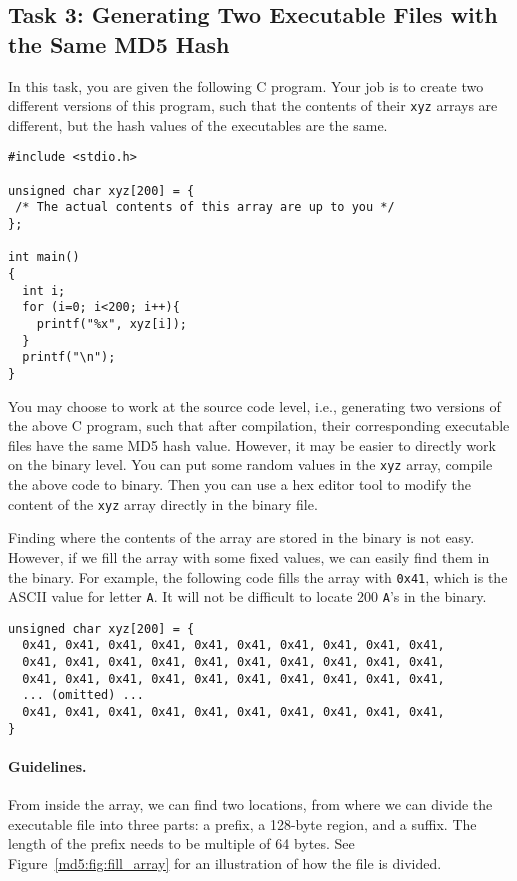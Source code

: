\subsection{Task 3: Generating Two Executable Files with the Same MD5 Hash}

In this task, you are given the following C program.
Your job is to create two different versions of this program, such that
the contents of their \texttt{xyz} arrays are different, but the
hash values of the executables are the same. 


\begin{lstlisting}
#include <stdio.h>

unsigned char xyz[200] = {
 /* The actual contents of this array are up to you */
};

int main()
{
  int i;
  for (i=0; i<200; i++){
    printf("%x", xyz[i]);
  }
  printf("\n");
}
\end{lstlisting}
 

You may choose to work at the source code level, i.e., generating two
versions of the above C program, such that after compilation, their 
corresponding executable files have the same MD5 hash value. However,
it may be easier to directly work on the binary level. You can 
put some random values in the \texttt{xyz} array,  
compile the above code to binary. Then you can use a hex editor 
tool to modify the content of the \texttt{xyz} array directly
in the binary file. 

Finding where the contents of the array are stored in the binary is 
not easy. However, if we fill the array with some fixed values, we can easily find 
them in the binary. For example, the following code 
fills the array with \texttt{0x41}, which is the ASCII value 
for letter \texttt{A}. It will not be difficult to 
locate 200 \texttt{A}'s in the binary. 


\begin{lstlisting}
unsigned char xyz[200] = {
  0x41, 0x41, 0x41, 0x41, 0x41, 0x41, 0x41, 0x41, 0x41, 0x41,
  0x41, 0x41, 0x41, 0x41, 0x41, 0x41, 0x41, 0x41, 0x41, 0x41,
  0x41, 0x41, 0x41, 0x41, 0x41, 0x41, 0x41, 0x41, 0x41, 0x41,
  ... (omitted) ...
  0x41, 0x41, 0x41, 0x41, 0x41, 0x41, 0x41, 0x41, 0x41, 0x41,
}
\end{lstlisting}
 

\paragraph{Guidelines.}
From inside the array, we can find two locations, from
where we can divide the executable file into three parts:
a prefix, a 128-byte region, and a suffix.
The length of the prefix needs to be multiple of 64 bytes.
See Figure~\ref{md5:fig:fill_array} for an illustration
of how the file is divided. 

